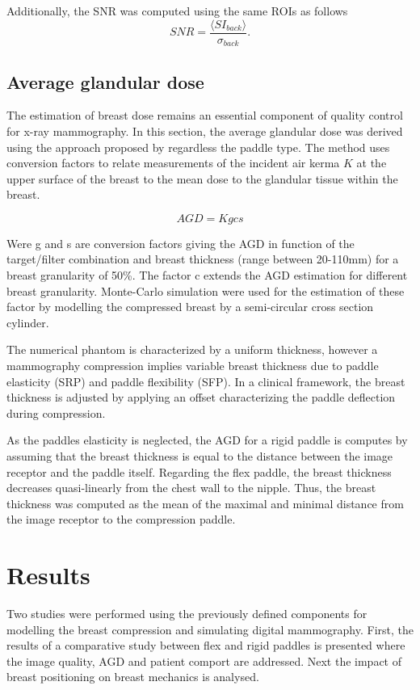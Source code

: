  
Additionally, the SNR was computed using the same ROIs as follows  
 \begin{equation}
 SNR = \frac{\langle SI_{back}\rangle}{\sigma_{back}}.
\end{equation}



\subsection{Average glandular dose}
The estimation of breast dose remains an essential component of quality control for x-ray mammography. In this section, the average glandular dose was derived using the approach proposed by \cite{dance_additional_2000} regardless the paddle type. The method uses conversion factors to relate measurements of the incident air kerma $K$ at the upper surface of the breast to the mean dose to the glandular tissue within the breast. 

\begin{equation}
AGD = K g c s
\end{equation}

Were g and s are conversion factors giving the AGD in function of the target/filter combination and breast thickness (range between 20-110mm) for a breast granularity of 50\%. The factor c extends the AGD estimation for different breast granularity. Monte-Carlo simulation were used for the estimation of these factor by modelling the compressed breast by a semi-circular cross section cylinder. 

The numerical phantom is characterized by a uniform thickness, however a mammography compression implies variable breast thickness due to paddle elasticity (SRP) and paddle flexibility (SFP). In a clinical framework, the breast thickness is adjusted by applying an offset characterizing the paddle deflection during compression.      

As the paddles elasticity is neglected, the AGD for a rigid paddle is computes by assuming that the breast thickness is equal to the distance between the image receptor and the paddle itself. Regarding the flex paddle, the breast thickness decreases quasi-linearly from the chest wall to the nipple. Thus, the breast thickness was computed as the mean of the maximal and minimal distance from the image receptor to the compression paddle.

\section{Results}\label{section:breastcompressionevaluation}
Two studies were performed using the previously defined components for modelling the breast compression and simulating digital mammography. First, the results of a comparative study between flex and rigid paddles is presented where the image quality, AGD and patient comport are addressed. Next the impact of breast positioning on breast mechanics is analysed.   
